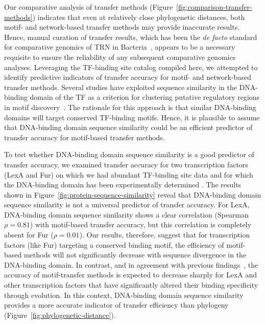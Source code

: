 Our comparative analysis of transfer methods
(Figure~\ref{fig:comparison-transfer-methods}) indicates that even at
relatively close phylogenetic distances, both motif- and network-based transfer
methods may provide inaccurate results. Hence, manual curation of transfer
results, which has been the \textit{de facto} standard for comparative genomics of TRN
in Bacteria~\citep{tan2001comparative, erill2004differences,
  gelfand2000comparative, novichkov2010regpredict}, appears to be a necessary
requisite to ensure the reliability of any subsequent comparative genomics
analyses. Leveraging the TF-binding site catalog compiled here, we attempted to
identify predictive indicators of transfer accuracy for motif- and
network-based transfer methods. Several studies have exploited sequence
similarity in the DNA-binding domain of the TF as a criterion for clustering
putative regulatory regions in motif discovery~\citep{francke2008generic,
  ravcheev2014comparative, dufour2010reconstruction, sahota2010novel}. The
rationale for this approach is that similar DNA-binding domains will target
conserved TF-binding motifs. Hence, it is plausible to assume that DNA-binding
domain sequence similarity could be an efficient predictor of transfer accuracy
for motif-based transfer methods.

To test whether DNA-binding domain sequence similarity is a good predictor of
transfer accuracy, we examined transfer accuracy for two transcription factors
(LexA and Fur) on which we had abundant TF-binding site data and for which the
DNA-binding domain has been experimentally determined
\citep{pohl2003architecture, zhang2010structure}. The results shown in
Figure~\ref{fig:protein-sequence-similarity} reveal that DNA-binding domain
sequence similarity is not a universal predictor of transfer accuracy. For
LexA, DNA-binding domain sequence similarity shows a clear correlation
(Spearman $\rho=0.81$) with motif-based transfer accuracy, but this correlation
is completely absent for Fur ($\rho=0.01$). Our results, therefore, suggest
that for transcription factors (like Fur) targeting a conserved binding motif,
the efficiency of motif-based methods will not significantly decrease with
sequence divergence in the DNA-binding domain. In contrast, and in agreement
with previous findings~\citep{yu2004annotation}, the accuracy of motif-transfer
methods is expected to decrease sharply for LexA and other transcription
factors that have significantly altered their binding specificity through
evolution. In this context, DNA-binding domain sequence similarity provides a
more accurate indicator of transfer efficiency than phylogeny
(Figure~\ref{fig:phylogenetic-distance}).

